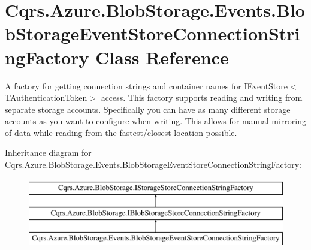 \hypertarget{classCqrs_1_1Azure_1_1BlobStorage_1_1Events_1_1BlobStorageEventStoreConnectionStringFactory}{}\section{Cqrs.\+Azure.\+Blob\+Storage.\+Events.\+Blob\+Storage\+Event\+Store\+Connection\+String\+Factory Class Reference}
\label{classCqrs_1_1Azure_1_1BlobStorage_1_1Events_1_1BlobStorageEventStoreConnectionStringFactory}


A factory for getting connection strings and container names for I\+Event\+Store$<$\+T\+Authentication\+Token$>$ access. This factory supports reading and writing from separate storage accounts. Specifically you can have as many different storage accounts as you want to configure when writing. This allows for manual mirroring of data while reading from the fastest/closest location possible.  


Inheritance diagram for Cqrs.\+Azure.\+Blob\+Storage.\+Events.\+Blob\+Storage\+Event\+Store\+Connection\+String\+Factory\+:\begin{figure}[H]
\begin{center}
\leavevmode
\includegraphics[height=3.000000cm]{classCqrs_1_1Azure_1_1BlobStorage_1_1Events_1_1BlobStorageEventStoreConnectionStringFactory}
\end{center}
\end{figure}
